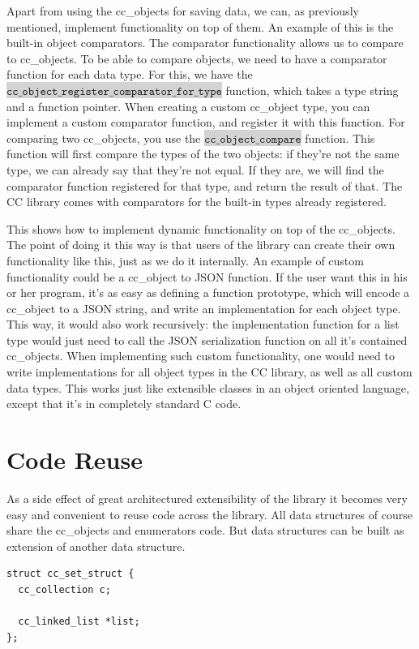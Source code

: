 \documentclass[table]{ituthesis}
\newcommand{\highlight}[1]{\colorbox{lightGray}{$\displaystyle \texttt{#1}$}}
\begin{document}
Apart from using the cc\_objects for saving data, we can, as previously mentioned, implement functionality on top of them. An example of this is the built-in object comparators. The comparator functionality allows us to compare to cc\_objects. To be able to compare objects, we need to have a comparator function for each data type. For this, we have the \highlight{cc\_object\_register\_comparator\_for\_type} function, which takes a type string and a function pointer. When creating a custom cc\_object type, you can implement a custom comparator function, and register it with this function. For comparing two cc\_objects, you use the \highlight{cc\_object\_compare} function. This function will first compare the types of the two objects: if they're not the same type, we can already say that they're not equal. If they are, we will find the comparator function registered for that type, and return the result of that. The CC library comes with comparators for the built-in types already registered.

This shows how to implement dynamic functionality on top of the cc\_objects. The point of doing it this way is that users of the library can create their own functionality like this, just as we do it internally. An example of custom functionality could be a cc\_object to JSON function. If the user want this in his or her program, it's as easy as defining a function prototype, which will encode a cc\_object to a JSON string, and write an implementation for each object type. This way, it would also work recursively: the implementation function for a list type would just need to call the JSON serialization function on all it's contained cc\_objects. When implementing such custom functionality, one would need to write implementations for all object types in the CC library, as well as all custom data types. This works just like extensible classes in an object oriented language, except that it's in completely standard C code.

\section{Code Reuse}\label{sec:impl_code_reuse}

As a side effect of great architectured extensibility of the library it becomes very easy and convenient to reuse code across the library. All data structures of course share the cc\_objects and enumerators code. But data structures can be built as extension of another data structure.

\begin{lstlisting}[label=cc_set-struct,caption=Example of internal code reuse]
struct cc_set_struct {
  cc_collection c;

  cc_linked_list *list;
};
\end{lstlisting}
\end{document}
